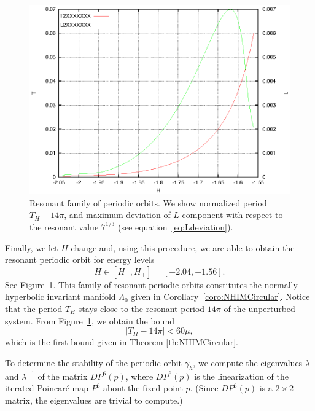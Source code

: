 \begin{figure}
\includegraphics{figs/porbits}
\caption{Resonant family of periodic orbits.
We show normalized period $T_H - 14\pi$, and maximum deviation of $L$
component with respect to the resonant value $7^{1/3}$ (see
equation~\eqref{eq:Ldeviation}).}
\label{fig:porbits}
\end{figure}

Finally, we let $H$ change and, using this procedure, we are able to
obtain the resonant periodic orbit for energy levels 
\[ H \in [\bar H_-, \bar H_+] = [-2.04,-1.56]. \] 
See Figure~\ref{fig:porbits}.
This family of resonant periodic orbits constitutes the normally
hyperbolic invariant manifold $\Lambda_0$ given in
Corollary~\ref{coro:NHIMCircular}. 
Notice that the period $T_H$ stays close to the resonant period $14\pi$ of the unperturbed system.
From Figure~\ref{fig:porbits}, we obtain the bound
\[ |T_H - 14\pi| < 60\mu, \]
which is the first bound given in Theorem \ref{th:NHIMCircular}.


To determine the stability of the periodic orbit $\gamma_h$, we
compute the eigenvalues $\lambda$ and $\lambda^{-1}$ of the matrix
$DP^6(p)$, where $DP^6(p)$ is the linearization of the iterated
Poincar\'e map $P^6$ about the fixed point $p$. 
(Since $DP^6(p)$ is a $2\times2$ matrix, the eigenvalues are trivial
to compute.)

